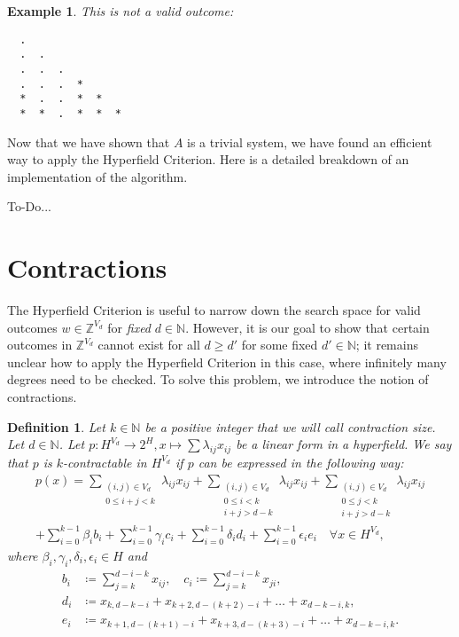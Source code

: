 \documentclass[11pt]{article}
\newtheorem{definition}[theorem]{Definition}
\newtheorem{example}[theorem]{Example}
\begin{document}
\begin{example}
 This is not a valid outcome:

  \begin{verbatim}
  .               
  .  .           
  .  .  .
  .  .  .  *
  *  .  .  *  *
  *  *  .  *  *  *
 \end{verbatim}
\end{example}

Now that we have shown that $A$ is a trivial system, we have found an efficient way to apply the Hyperfield Criterion. Here is a detailed breakdown of an implementation of the algorithm.

To-Do...

\section{Contractions}

The Hyperfield Criterion is useful to narrow down the search space for valid outcomes $w \in \mathbb{Z}^{V_{d}}$ for \emph{fixed} $d \in \mathbb{N}$. However, it is our goal to show that certain outcomes in $\mathbb{Z}^{V_{d}}$ cannot exist for all $d \geq d'$ for some fixed $d' \in \mathbb{N}$; it remains unclear how to apply the Hyperfield Criterion in this case, where infinitely many degrees need to be checked. To solve this problem, we introduce the notion of contractions.

\begin{definition}
  Let $k \in \mathbb{N}$ be a positive integer that we will call \emph{contraction size}. Let $d \in \mathbb{N}$. Let $p: H^{V_{d}} \to 2^H, x \mapsto \sum \lambda_{ij}x_{ij}$ be a linear form in a hyperfield. We say that $p$ is $k$-contractable in $H^{V_{d}}$ if $p$ can be expressed in the following way:
\begin{align*}
  p(x) = \sum_{\substack{(i,j) \in V_{d} \\ 0 \leq i + j < k}}\lambda_{ij}x_{ij} +
  \sum_{\substack{(i,j) \in V_{d} \\ 0 \leq i < k \\ i + j > d - k }}\lambda_{ij}x_{ij} +
  \sum_{\substack{(i,j) \in V_{d} \\ 0 \leq j < k \\ i + j > d - k }}\lambda_{ij}x_{ij} \\
  +
  \sum_{i=0}^{k-1} \beta_{i} b_{i} +
  \sum_{i=0}^{k-1} \gamma_{i} c_{i} +
  \sum_{i=0}^{k-1} \delta_{i} d_{i} +
  \sum_{i=0}^{k-1} \epsilon_{i} e_{i} \quad \forall x \in H^{V_{d}},
\end{align*}
where $\beta_{i}, \gamma_{i}, \delta_{i}, \epsilon_{i} \in H$ and 
\begin{align*}
  b_{i} &\coloneqq \sum_{j=k}^{d - i - k} x_{ij}, \quad c_{i} \coloneqq \sum_{j=k}^{d - i - k} x_{ji}, \\ 
  d_{i} &\coloneqq x_{k, d - k - i} + x_{k+2, d-(k + 2)-i} + \dots + x_{d - k - i, k},\\
  e_{i} &\coloneqq x_{k + 1, d - (k + 1) - i} + x_{k+3, d-(k + 3)-i} + \dots + x_{d - k - i, k}.
\end{align*}
\end{definition}
\end{document}
